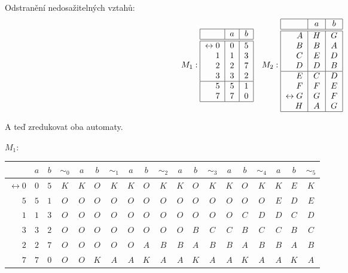 Odstranění nedosažitelných vztahů:
\[
M_1:
\begin{tabular}{|r|c|c|}
    \hline
    & $a$ & $b$\\
    \hline
    \hline
    $\leftrightarrow 0$& $0$ & $5$\\
    $1$                & $1$ & $3$\\
    $2$                & $2$ & $7$\\
    $3$                & $3$ & $2$\\
    \hline
    $5$                & $5$ & $1$\\
    $7$                & $7$ & $0$\\
    \hline
\end{tabular}
\quad
M_2:
\begin{tabular}{|r|c|c|}
    \hline
    & $a$ & $b$\\
    \hline
    \hline
    $A$                & $H$ & $G$\\
    $B$                & $B$ & $A$\\
    $C$                & $E$ & $D$\\
    $D$                & $D$ & $B$\\
    \hline
    $E$                & $C$ & $D$\\
    $F$                & $F$ & $E$\\
    $\leftrightarrow G$& $G$ & $F$\\
    $H$                & $A$ & $G$\\
    \hline
\end{tabular}
\]

A teď zredukovat oba automaty.

$M_1$:
\begin{tabular}{|r|c c|c|c c|c|c c|c|c c|c|c c|c|c c|c|}
    \hline
    & $a$ & $b$ & $\sim_0$ & $a$ & $b$ & $\sim_1$ & $a$ & $b$ & $\sim_2$ & $a$ & $b$ & $\sim_3$ & $a$ & $b$ & $\sim_4$ & $a$ & $b$ & $\sim_5$ \\ \hline \hline
    $\leftrightarrow$$0$ &$0$ &$5$ &$K$ &$K$ &$O$ &$K$ &$K$ &$O$ &$K$ &$K$ &$O$ &$K$ &$K$ &$O$ &$K$ &$K$ &$E$ &$K$ \\
    $5$ &$5$ &$1$ &$O$ &$O$ &$O$ &$O$ &$O$ &$O$ &$O$ &$O$ &$O$ &$O$ &$O$ &$O$ &$O$ &$E$ &$D$ &$E$ \\
    $1$ &$1$ &$3$ &$O$ &$O$ &$O$ &$O$ &$O$ &$O$ &$O$ &$O$ &$O$ &$O$ &$O$ &$C$ &$D$ &$D$ &$C$ &$D$ \\
    $3$ &$3$ &$2$ &$O$ &$O$ &$O$ &$O$ &$O$ &$O$ &$O$ &$O$ &$B$ &$C$ &$C$ &$B$ &$C$ &$C$ &$B$ &$C$ \\
    $2$ &$2$ &$7$ &$O$ &$O$ &$O$ &$O$ &$O$ &$A$ &$B$ &$B$ &$A$ &$B$ &$B$ &$A$ &$B$ &$B$ &$A$ &$B$ \\
    $7$ &$7$ &$0$ &$O$ &$O$ &$K$ &$A$ &$A$ &$K$ &$A$ &$A$ &$K$ &$A$ &$A$ &$K$ &$A$ &$A$ &$K$ &$A$ \\
    \hline
\end{tabular}

